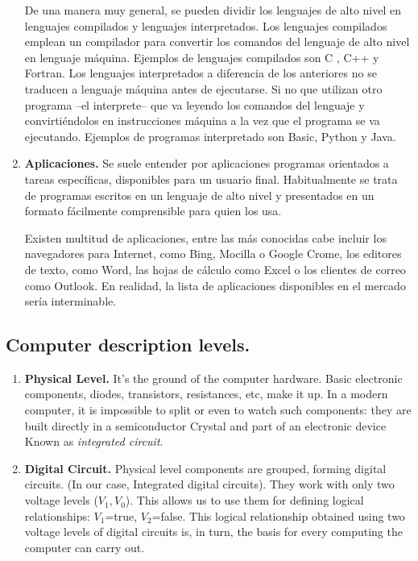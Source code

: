 \begin{paracol}{2}
\begin{enumerate}
De una manera muy general, se pueden dividir los lenguajes de alto nivel en lenguajes compilados y lenguajes interpretados. Los lenguajes compilados emplean un compilador para convertir los comandos del lenguaje de alto nivel en lenguaje máquina. Ejemplos de lenguajes compilados son C , C++ y Fortran. Los lenguajes interpretados a diferencia de los anteriores no se traducen a lenguaje máquina antes de ejecutarse. Si no que utilizan otro programa --el interprete-- que va leyendo los comandos del lenguaje y convirtiéndolos en instrucciones máquina a la vez que el programa se va ejecutando. Ejemplos de programas interpretado son Basic, Python y Java.

\item \textbf{Aplicaciones.}  Se suele entender por aplicaciones programas orientados a tareas específicas, disponibles para un usuario final. Habitualmente se trata de programas escritos en un lenguaje de alto nivel y presentados en un formato fácilmente comprensible para quien los usa.

Existen multitud de aplicaciones, entre las más conocidas cabe incluir los navegadores para Internet, como Bing, Mocilla o Google Crome, los editores de texto, como Word, las hojas de cálculo como Excel o los clientes de correo como Outlook. En realidad, la lista de aplicaciones disponibles en el mercado sería interminable. 
\end{enumerate}

\switchcolumn
\subsection{Computer description levels.}
\begin{enumerate}
\item \textbf{Physical Level.} It's the ground of the computer hardware. Basic electronic components, diodes, transistors, resistances, etc, make it up. In a modern computer, it is impossible to split or even to watch such components: they are built directly in a semiconductor Crystal and part\; of an electronic device Known as \emph{integrated circuit}.

\item \textbf{Digital Circuit.}
Physical level components are grouped, forming digital circuits. (In our case, Integrated digital circuits). They work with only two voltage levels ($V_1, V_0$). This allows us to use them for defining logical relationships: $V_1$=true, $V_2$=false. This logical relationship obtained using two voltage levels of digital circuits is, in turn, the basis for every computing the computer can carry out.


\end{enumerate}
\end{paracol}
